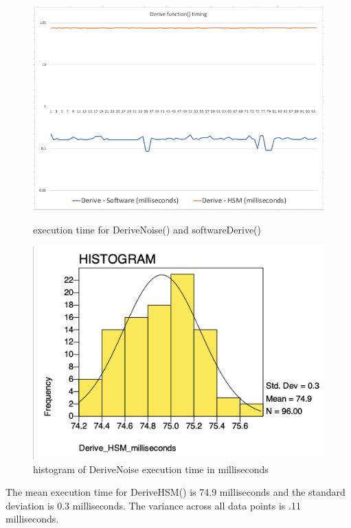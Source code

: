 \documentclass [11pt, proquest] {uwthesis}[2020/02/24]
\begin{document}
\begin{figure}
\centering
\begin{minipage}{.5\textwidth}
  \centering
  \includegraphics[width=1\linewidth]{paper/images/deriveFunctiongraph.png}
  \caption{execution time for DeriveNoise() and softwareDerive()}
  \label{fig:funcTimeGraph}
\end{minipage}%
\begin{minipage}{.5\textwidth}
  \centering
  \includegraphics[width=1\linewidth]{paper/images/DeriveNoise freq.png}
  \caption{histogram of DeriveNoise execution time in milliseconds}
  \label{fig:hsmTimeGraph}
\end{minipage}
\end{figure}

The mean execution time for DeriveHSM() is 74.9 milliseconds and the standard deviation is 0.3 milliseconds. The variance across all data points is .11 milliseconds. 
\end{document}
